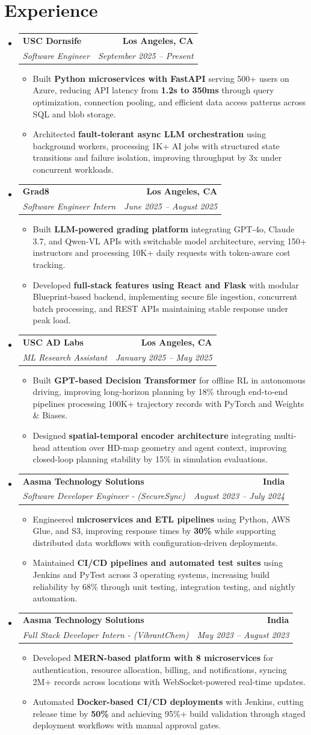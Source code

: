 \documentclass[letterpaper,10pt]{article}
\makeatletter
\newcommand{\resumeItem}[1]{\item\small{{#1 \vspace{-2pt}}}}
\newcommand{\resumeSubheading}[4]{\vspace{-1pt}\item\begin{tabular*}{1.0\textwidth}[t]{l@{\extracolsep{\fill}}r}\textbf{#1} & \textbf{\small #2} \\\textit{\small#3} & \textit{\small #4} \\\end{tabular*}\vspace{-2pt}}
\newcommand{\resumeSubHeadingListStart}{\begin{itemize}[leftmargin=0.0in, label={}]}
\newcommand{\resumeSubHeadingListEnd}{\end{itemize}}
\newcommand{\resumeItemListStart}{\begin{itemize}[leftmargin=0.15in,label=\textbullet,itemsep=2pt,topsep=0pt,parsep=0pt,partopsep=0pt]}
\newcommand{\resumeItemListEnd}{\end{itemize}\vspace{-4pt}}
\makeatother
\begin{document}
\section{Experience}
\resumeSubHeadingListStart
\resumeSubheading{USC Dornsife}{Los Angeles, CA}{Software Engineer}{September 2025 -- Present}
\resumeItemListStart
\resumeItem{Built \textbf{Python microservices with FastAPI} serving 500+ users on Azure, reducing API latency from \textbf{1.2s to 350ms} through query optimization, connection pooling, and efficient data access patterns across SQL and blob storage.}
\resumeItem{Architected \textbf{fault-tolerant async LLM orchestration} using background workers, processing 1K+ AI jobs with structured state transitions and failure isolation, improving throughput by 3x under concurrent workloads.}
\resumeItemListEnd
\resumeSubheading{Grad8}{Los Angeles, CA}{Software Engineer Intern}{June 2025 -- August 2025}
\resumeItemListStart
\resumeItem{Built \textbf{LLM-powered grading platform} integrating GPT-4o, Claude 3.7, and Qwen-VL APIs with switchable model architecture, serving 150+ instructors and processing 10K+ daily requests with token-aware cost tracking.}
\resumeItem{Developed \textbf{full-stack features using React and Flask} with modular Blueprint-based backend, implementing secure file ingestion, concurrent batch processing, and REST APIs maintaining stable response under peak load.}
\resumeItemListEnd
\resumeSubheading{USC AD Labs}{Los Angeles, CA}{ML Research Assistant}{January 2025 -- May 2025}
\resumeItemListStart
\resumeItem{Built \textbf{GPT-based Decision Transformer} for offline RL in autonomous driving, improving long-horizon planning by 18\% through end-to-end pipelines processing 100K+ trajectory records with PyTorch and Weights \& Biases.}
\resumeItem{Designed \textbf{spatial-temporal encoder architecture} integrating multi-head attention over HD-map geometry and agent context, improving closed-loop planning stability by 15\% in simulation evaluations.}
\resumeItemListEnd
\resumeSubheading{Aasma Technology Solutions}{India}{Software Developer Engineer - (SecureSync)}{August 2023 -- July 2024}
\resumeItemListStart
\resumeItem{Engineered \textbf{microservices and ETL pipelines} using Python, AWS Glue, and S3, improving response times by \textbf{30\%} while supporting distributed data workflows with configuration-driven deployments.}
\resumeItem{Maintained \textbf{CI/CD pipelines and automated test suites} using Jenkins and PyTest across 3 operating systems, increasing build reliability by 68\% through unit testing, integration testing, and nightly automation.}
\resumeItemListEnd
\resumeSubheading{Aasma Technology Solutions}{India}{Full Stack Developer Intern - (VibrantChem)}{May 2023 -- August 2023}
\resumeItemListStart
\resumeItem{Developed \textbf{MERN-based platform with 8 microservices} for authentication, resource allocation, billing, and notifications, syncing 2M+ records across locations with WebSocket-powered real-time updates.}
\resumeItem{Automated \textbf{Docker-based CI/CD deployments} with Jenkins, cutting release time by \textbf{50\%} and achieving 95\%+ build validation through staged deployment workflows with manual approval gates.}
\resumeItemListEnd
\resumeSubHeadingListEnd
\vspace{-14pt}
\end{document}
